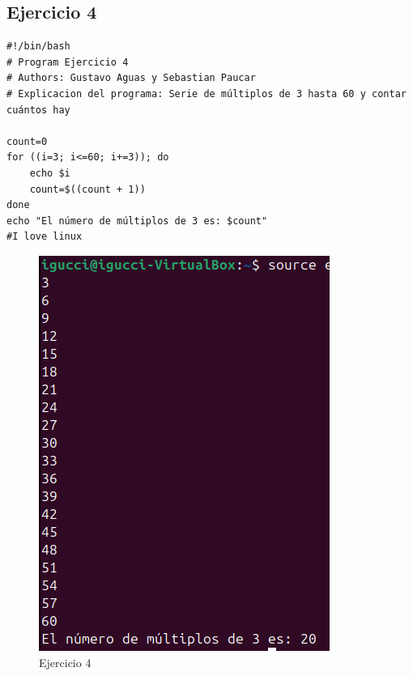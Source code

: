 \documentclass[11pt,twoside]{book}
\begin{document}
\subsection{Ejercicio 4}
\begin{lstlisting}
#!/bin/bash
# Program Ejercicio 4
# Authors: Gustavo Aguas y Sebastian Paucar
# Explicacion del programa: Serie de múltiplos de 3 hasta 60 y contar cuántos hay

count=0
for ((i=3; i<=60; i+=3)); do
    echo $i
    count=$((count + 1))
done
echo "El número de múltiplos de 3 es: $count"
#I love linux
\end{lstlisting}
\begin{figure}
    \centering
    \includegraphics[width=0.75\linewidth]{series/ej4.png}
    \caption{Ejercicio 4}
\end{figure}
\newpage
\end{document}
